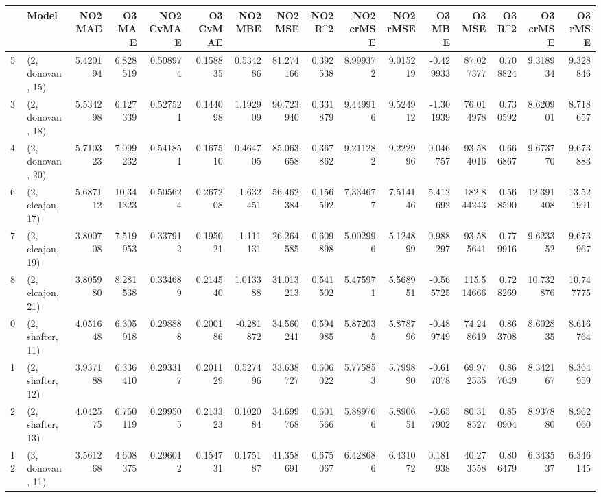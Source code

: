 \begin{tabular}{llrrrrrrrrrrrrrr}
\toprule
{} &             Model &   NO2 MAE &     O3 MAE &  NO2 CvMAE &  O3 CvMAE &   NO2 MBE &     NO2 MSE &   NO2 R\textasciicircum2 &  NO2 crMSE &   NO2 rMSE &    O3 MBE &      O3 MSE &    O3 R\textasciicircum2 &   O3 crMSE &    O3 rMSE \\
\midrule
5  &  (2, donovan, 15) &  5.420194 &   6.828519 &   0.508974 &  0.158835 &  0.534286 &   81.274166 &  0.392538 &   8.999372 &   9.015219 & -0.429933 &   87.027377 &  0.708824 &   9.318934 &   9.328846 \\
3  &  (2, donovan, 18) &  5.534298 &   6.127339 &   0.527521 &  0.144098 &  1.192909 &   90.723940 &  0.331879 &   9.449916 &   9.524912 & -1.301939 &   76.014978 &  0.730592 &   8.620901 &   8.718657 \\
4  &  (2, donovan, 20) &  5.710323 &   7.099232 &   0.541851 &  0.167510 &  0.464705 &   85.063658 &  0.367862 &   9.211282 &   9.222996 &  0.046757 &   93.584016 &  0.666867 &   9.673770 &   9.673883 \\
6  &  (2, elcajon, 17) &  5.687112 &  10.341323 &   0.505624 &  0.267208 & -1.632451 &   56.462384 &  0.156592 &   7.334677 &   7.514146 &  5.412692 &  182.844243 &  0.568590 &  12.391408 &  13.521991 \\
7  &  (2, elcajon, 19) &  3.800708 &   7.519953 &   0.337912 &  0.195021 & -1.111131 &   26.264585 &  0.609898 &   5.002996 &   5.124899 &  0.988297 &   93.585641 &  0.779916 &   9.623352 &   9.673967 \\
8  &  (2, elcajon, 21) &  3.805980 &   8.281538 &   0.334689 &  0.214540 &  1.013388 &   31.013213 &  0.541502 &   5.475971 &   5.568951 & -0.565725 &  115.514666 &  0.728269 &  10.732876 &  10.747775 \\
0  &  (2, shafter, 11) &  4.051648 &   6.305918 &   0.298888 &  0.200186 & -0.281872 &   34.560241 &  0.594985 &   5.872035 &   5.878796 & -0.489749 &   74.248619 &  0.863708 &   8.602835 &   8.616764 \\
1  &  (2, shafter, 12) &  3.937188 &   6.336410 &   0.293317 &  0.201129 &  0.527496 &   33.638727 &  0.606022 &   5.775853 &   5.799890 & -0.617078 &   69.972535 &  0.867049 &   8.342167 &   8.364959 \\
2  &  (2, shafter, 13) &  4.042575 &   6.760119 &   0.299505 &  0.213323 &  0.102084 &   34.699768 &  0.601566 &   5.889766 &   5.890651 & -0.657902 &   80.318527 &  0.850904 &   8.937880 &   8.962060 \\
12 &  (3, donovan, 11) &  3.561268 &   4.608375 &   0.296012 &  0.154731 &  0.175187 &   41.358691 &  0.675067 &   6.428686 &   6.431072 &  0.181938 &   40.273558 &  0.806479 &   6.343537 &   6.346145 \\

\end{tabular}
